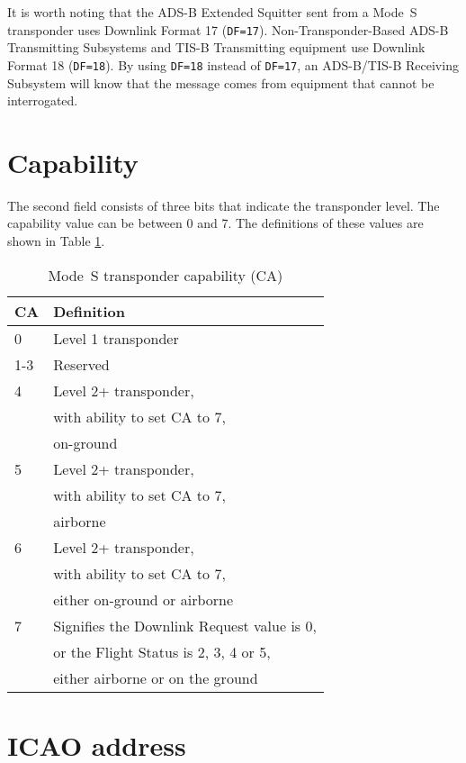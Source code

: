 It is worth noting that the ADS-B Extended Squitter sent from a Mode~S transponder uses Downlink Format 17 (\texttt{DF=17}). Non-Transponder-Based ADS-B Transmitting Subsystems and TIS-B Transmitting equipment use Downlink Format 18 (\texttt{DF=18}). By using \texttt{DF=18} instead of \texttt{DF=17}, an ADS-B/TIS-B Receiving Subsystem will know that the message comes from equipment that cannot be interrogated.

\section{Capability}

The second field consists of three bits that indicate the transponder level. The capability value can be between 0 and 7. The definitions of these values are shown in Table \ref{tb:transponder_capability}.

\begin{table}[!ht]
\centering
\caption{Mode~S transponder capability (CA)}
\label{tb:transponder_capability}
\begin{tabular}{|l|p{8cm}|}
\hline
\textbf{CA} & \textbf{Definition} \\ \hline
0 & Level 1 transponder \\ \hline
1-3 & Reserved \\ \hline
4 & Level 2+ transponder, \\
& with ability to set CA to 7, \\ 
& on-ground \\ \hline
5 & Level 2+ transponder, \\
& with ability to set CA to 7, \\
& airborne \\ \hline
6 & Level 2+ transponder, \\ 
& with ability to set CA to 7, \\ 
& either on-ground or airborne \\ \hline
7 & Signifies the Downlink Request value is 0, \\
& or the Flight Status is 2, 3, 4 or 5, \\
& either airborne or on the ground \\ \hline
\end{tabular}
\end{table}

\section{ICAO address}

